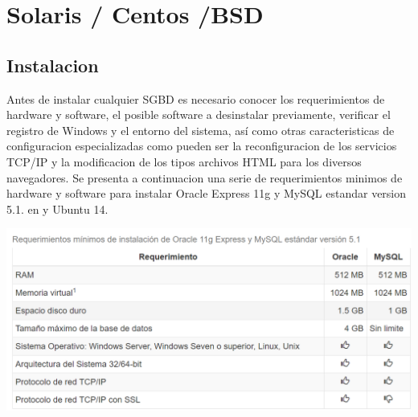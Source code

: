 \documentclass[12pt,letterpaper]{article}
\begin{document}
\newpage

 
\section{Solaris / Centos /BSD}
\subsection{Instalacion}
Antes de instalar cualquier SGBD es necesario conocer los requerimientos de hardware y software, el posible software a desinstalar previamente, verificar el registro de Windows y el entorno del sistema, así como otras caracteristicas de configuracion especializadas como pueden ser la reconfiguracion de los servicios TCP/IP y la modificacion de los tipos archivos HTML para los diversos navegadores.
Se presenta a continuacion una serie de requerimientos minimos de hardware y software para instalar Oracle Express 11g y MySQL estandar version 5.1. en y Ubuntu 14.
\begin{center}
\includegraphics[width=15cm]{./IMG/img23}
\end{center}
\end{document}
